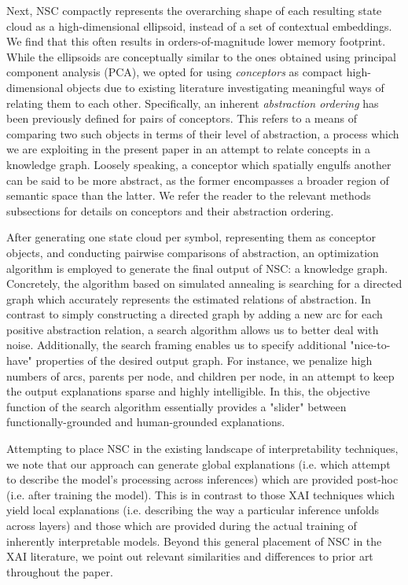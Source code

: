 Next, NSC compactly represents the overarching shape of each resulting state cloud as a high-dimensional ellipsoid, instead of a set of contextual embeddings. We find that this often results in orders-of-magnitude lower memory footprint. While the ellipsoids are conceptually similar to the ones obtained using principal component analysis (PCA), we opted for using \textit{conceptors} as compact high-dimensional objects due to existing literature investigating meaningful ways of relating them to each other. Specifically, an inherent \textit{abstraction ordering} has been previously defined for pairs of conceptors. This refers to a means of comparing two such objects in terms of their level of abstraction, a process which we are exploiting in the present paper in an attempt to relate concepts in a knowledge graph. Loosely speaking, a conceptor which spatially engulfs another can be said to be more abstract, as the former encompasses a broader region of semantic space than the latter. We refer the reader to the relevant methods subsections for details on conceptors and their abstraction ordering.

After generating one state cloud per symbol, representing them as conceptor objects, and conducting pairwise comparisons of abstraction, an optimization algorithm is employed to generate the final output of NSC: a knowledge graph. Concretely, the algorithm based on simulated annealing is searching for a directed graph which accurately represents the estimated relations of abstraction. In contrast to simply constructing a directed graph by adding a new arc for each positive abstraction relation, a search algorithm allows us to better deal with noise. Additionally, the search framing enables us to specify additional "nice-to-have" properties of the desired output graph. For instance, we penalize high numbers of arcs, parents per node, and children per node, in an attempt to keep the output explanations sparse and highly intelligible. In this, the objective function of the search algorithm essentially provides a "slider" between functionally-grounded and human-grounded explanations.

Attempting to place NSC in the existing landscape of interpretability techniques, we note that our approach can generate global explanations (i.e. which attempt to describe the model's processing across inferences) which are provided post-hoc (i.e. after training the model). This is in contrast to those XAI techniques which yield local explanations (i.e. describing the way a particular inference unfolds across layers) and those which are provided during the actual training of inherently interpretable models. Beyond this general placement of NSC in the XAI literature, we point out relevant similarities and differences to prior art throughout the paper.

